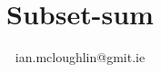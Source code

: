 \documentclass[dvipsnames,hidelinks,t]{beamer}
\begin{document}
    \title{Subset-sum}
    \subtitle{}
    \author{ian.mcloughlin@gmit.ie}
    \date{}
  
    \begin{frame}
      \titlepage
    \end{frame}
  
     
  
\end{document}
